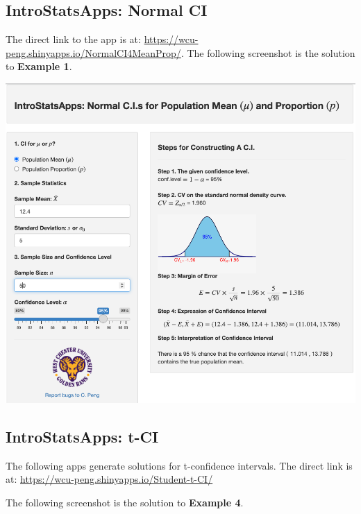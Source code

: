 \documentclass[
]{book}
\begin{document}
\hypertarget{introstatsapps-normal-ci}{%
\subsection{\texorpdfstring{\textbf{IntroStatsApps}: Normal CI}{IntroStatsApps: Normal CI}}\label{introstatsapps-normal-ci}}

The direct link to the app is at: \url{https://wcu-peng.shinyapps.io/NormalCI4MeanProp/}. The following screenshot is the solution to \textbf{Example 1}.

\begin{center}\includegraphics[width=0.8\linewidth]{week07/appsMeanProp} \end{center}

\hypertarget{introstatsapps-t-ci}{%
\subsection{\texorpdfstring{\textbf{IntroStatsApps}: t-CI}{IntroStatsApps: t-CI}}\label{introstatsapps-t-ci}}

The following apps generate solutions for t-confidence intervals. The direct link is at: \url{https://wcu-peng.shinyapps.io/Student-t-CI/}

The following screenshot is the solution to \textbf{Example 4}.
\end{document}
